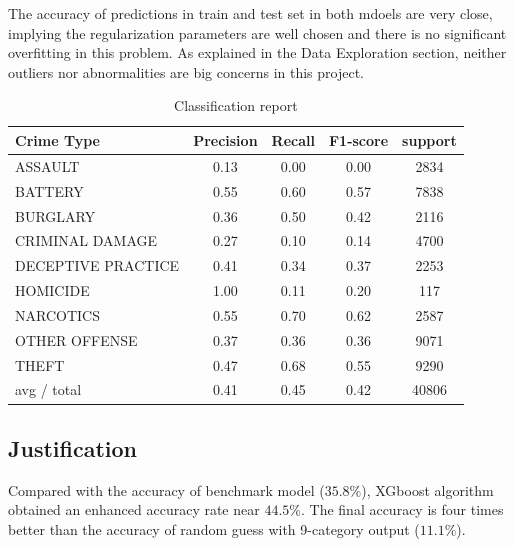 \documentclass[12pt]{article}
\begin{document}
The accuracy of predictions in train and test set in both mdoels are very close, implying the regularization parameters are well chosen and there is no significant overfitting  in this problem. As explained in the Data Exploration section, neither outliers nor abnormalities are big concerns in this project. 


 
\begin{table}
\caption{Classification report}
\label{tab:report}
\begin{center}
\begin{tabular}{l|c|c|c|c}
\hline
\bf Crime Type&        \bf Precision&    \bf Recall&  \bf F1-score&    \bf support\\
\hline
           ASSAULT&       0.13&      0.00&      0.00     & 2834\\
           BATTERY&       0.55 &     0.60 &     0.57     & 7838\\
          BURGLARY&       0.36 &     0.50  &    0.42     & 2116\\
   CRIMINAL DAMAGE&       0.27  &    0.10   &   0.14     & 4700\\
DECEPTIVE PRACTICE &      0.41   &   0.34 &  0.37     & 2253\\
          HOMICIDE  &     1.00    &  0.11  &    0.20      & 117\\
         NARCOTICS   &    0.55     & 0.70   &   0.62     & 2587\\
     OTHER OFFENSE    &   0.37  &0.36      &0.36      &9071\\
             THEFT     &  0.47   &   0.68   &   0.55     & 9290\\
\hline
       avg / total      & 0.41    &  0.45    &  0.42    & 40806\\
\hline
\end{tabular}
\end{center}
\end{table}
\subsection{Justification}
Compared with the accuracy of benchmark model ($35.8\%$), XGboost algorithm obtained an enhanced accuracy rate near $44.5\%$. The final accuracy is four times better than the accuracy of random guess with 9-category output ($11.1\%$). 
\end{document}
